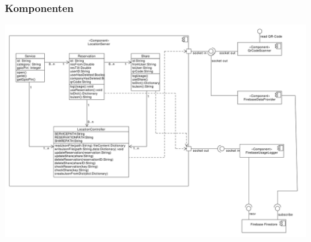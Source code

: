 \documentclass[openright,twoside,a4paper]{scrartcl}
\begin{document}
                \subsubsection{Komponenten}
                    \includegraphics[scale=0.35]{Bilder/Component_16112019.pdf}
                    
\end{document}
